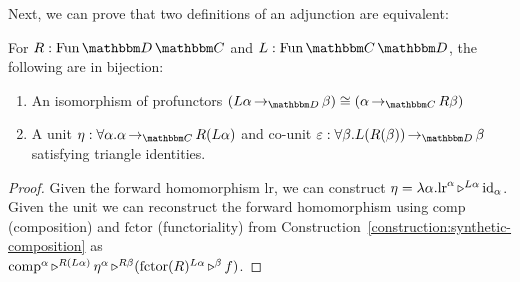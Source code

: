 \documentclass{llncs}
\begin{document}
Next, we can prove that two definitions of an adjunction are equivalent:
\begin{lemma} \label{lem:adjunction}
  For $R : \varr {\cat D}{\cat C}$ and $L : \varr {\cat
    C}{\cat D}$, the following are in bijection:
  \begin{enumerate}
  \item An isomorphism of profunctors $(\punitinXfromYtoZ {\cat D} {L \alpha}{\beta}) \cong (\punitinXfromYtoZ {\cat C} \alpha {R \beta})$
  \item A unit $\eta : \pendallXdotY \alpha {\punitinXfromYtoZ {\cat C} \alpha
    {R(L\alpha)}}$ and co-unit $\varepsilon: \pendallXdotY \beta
    {\punitinXfromYtoZ {\cat D} {L(R(\beta))}{\beta}}$ satisfying triangle
    identities.
  \end{enumerate}
\end{lemma}
\begin{proof}
  Given the forward homomorphism $\text{lr}$, we can construct $\eta =
  \pendlambdaXdotY \alpha \appunary {\text{lr}} \alpha {\punitrefl
    \alpha} {L \alpha}$.  Given the unit we can reconstruct the
  forward homomorphism using
  $\text{comp}$ (composition) and $\text{fctor}$ (functoriality) from
  Construction~\ref{construction:synthetic-composition} as\\
  $\appbinary {\text{comp}} \alpha
  {\pendappXtoY \eta \alpha} {R(L\alpha)} {(\appunary
    {\text{fctor}(R)}{L \alpha} {f} {\beta})} {R \beta}$.
\end{proof}
\end{document}
